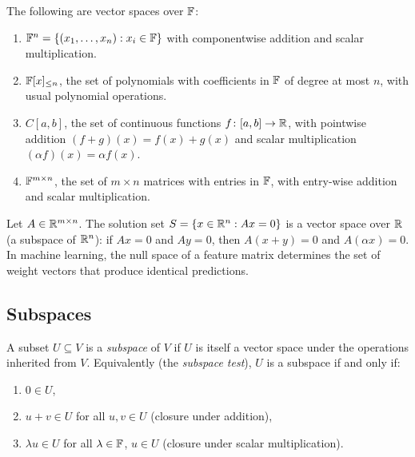\documentclass[11pt,a4paper]{article}
\begin{document}
\begin{example}
\label{ex:standard_spaces}
The following are vector spaces over $\mathbb{F}$:
\begin{enumerate}[nosep]
  \item $\mathbb{F}^n = \{(x_1, \ldots, x_n) : x_i \in \mathbb{F}\}$ with componentwise addition
        and scalar multiplication.
  \item $\mathbb{F}[x]_{\leq n}$, the set of polynomials with coefficients in $\mathbb{F}$ of
        degree at most $n$, with usual polynomial operations.
  \item $C[a,b]$, the set of continuous functions $f\colon [a,b] \to \mathbb{R}$, with
        pointwise addition $(f+g)(x) = f(x) + g(x)$ and scalar multiplication
        $(\alpha f)(x) = \alpha f(x)$.
  \item $\mathbb{F}^{m \times n}$, the set of $m \times n$ matrices with entries in $\mathbb{F}$,
        with entry-wise addition and scalar multiplication.
\end{enumerate}
\end{example}

\begin{example}
\label{ex:solution_space}
Let $A \in \mathbb{R}^{m \times n}$.  The solution set
$S = \{x \in \mathbb{R}^n : Ax = 0\}$ is a vector space over $\mathbb{R}$ (a subspace of $\mathbb{R}^n$):
if $Ax = 0$ and $Ay = 0$, then $A(x + y) = 0$ and $A(\alpha x) = 0$.
In machine learning, the null space of a feature matrix determines the set of
weight vectors that produce identical predictions.
\end{example}

\subsection{Subspaces}

\begin{definition}[Subspace]
\label{def:subspace}
A subset $U \subseteq V$ is a \emph{subspace} of $V$ if $U$ is itself a vector
space under the operations inherited from $V$.  Equivalently (the \emph{subspace
test}), $U$ is a subspace if and only if:
\begin{enumerate}[nosep]
  \item $0 \in U$,
  \item $u + v \in U$ for all $u, v \in U$ \quad (closure under addition),
  \item $\lambda u \in U$ for all $\lambda \in \mathbb{F}$, $u \in U$
        \quad (closure under scalar multiplication).
\end{enumerate}
\end{definition}
\end{document}

